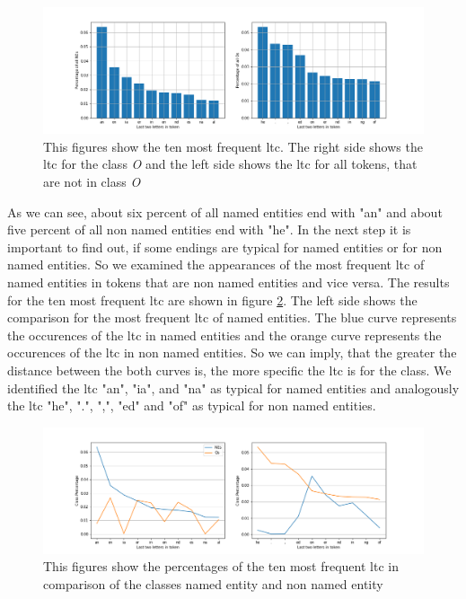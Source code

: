 \documentclass[noindent, nochapname]{tudexercise}
\begin{document}
			\begin{figure}[h]
				\centering
				\includegraphics[scale=0.5]{img/last_two_letters_per_class.png}
				\caption{This figures show the ten most frequent ltc. The right side shows the ltc for the class \textit{O} and the left side shows the ltc for all tokens, that are not in class \textit{O}}
				\label{fig:ten_most_frequent_ltc}
			\end{figure}
			
			As we can see, about six percent of all named entities end with "an" and about five percent of all non named entities end with "he". In the next step it is important to find out, if some endings are typical for named entities or for non named entities. So we examined the appearances of the most frequent ltc of named entities in tokens that are non named entities and vice versa. The results for the ten most frequent ltc are shown in figure \ref{fig:ten_most_frequent_comparison}. The left side shows the comparison for the most frequent ltc of named entities. The blue curve represents the occurences of the ltc in named entities and the orange curve represents the occurences of the ltc in non named entities. So we can imply, that the greater the distance between the both curves is, the more specific the ltc is for the class. We identified the ltc "an", "ia", and "na" as typical for named entities and analogously the ltc "he", ".", ",", "ed" and "of" as typical for non named entities.\\
			
			\begin{figure}[h]
				\centering
				\includegraphics[scale=0.5]{img/last_two_letters_comparison.png}
				\caption{This figures show the percentages of the ten most frequent ltc in comparison of the classes named entity and non named entity}
				\label{fig:ten_most_frequent_comparison}
			\end{figure}
						
\end{document}
